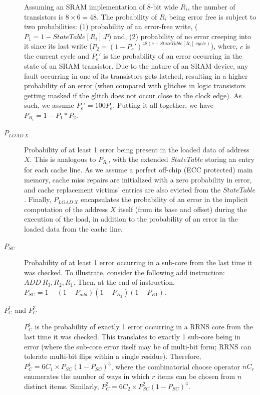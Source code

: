 \documentclass{sig-alternate}
\begin{document}
\begin{description}
Assuming an SRAM implementation of 8-bit wide $R_i$, the number of transistors is $8\times 6=48$. The probability of $R_i$ being error free is subject to two probabilities: (1) probability of an error-free write, ($P_1 = 1 - StateTable[R_i].P$) and, (2) probability of no error creeping into it since its last write ($P_2 = (1 - P_e')^{48(c - StateTable[R_i].cycle)}$), where, $c$ is the current cycle and $P_e'$ is the probability of an error occurring in the state of an SRAM transistor. Due to the nature of an SRAM device, any fault occurring in one of its transistors gets latched, resulting in a higher probability of an error (when compared with glitches in logic transistors getting masked if the glitch does not occur close to the clock edge). As such, we assume $P_e'=100P_e$. Putting it all together, we have $P_{R_i} = 1 - P_1*P_2$.

\item[$P_{LOAD ~X}$]
Probability of at least 1 error being present in the loaded data of address $X$. This is analogous to $P_{R_i}$, with the extended $StateTable$ storing an entry for each cache line. As we assume a perfect off-chip (ECC protected) main memory, cache miss repairs are initialized with a zero probability in error, and cache replacement victims' entries are also evicted from the $StateTable$. Finally, $P_{LOAD~X}$ encapsulates the probability of an error in the implicit computation of the address $X$ itself (from its base and offset) during the execution of the load, in addition to the probability of an error in the loaded data from the cache line.

\item[$P_{SC}$]
Probability of at least 1 error occurring in a sub-core from the last time it was checked. To illustrate, consider the following add instruction: $ADD~R_3,R_2,R_1$. Then, at the end of instruction, $P_{SC}=1-(1-P_{add})(1-P_{R_2})(1-P_{R1})$.

\item[$P_C^{1}$ and $P_C^{2}$]
$P_C^{1}$ is the probability of exactly 1 error occurring in a RRNS core from the last time it was checked. This translates to exactly 1 sub-core being in error (where the sub-core error itself may be of multi-bit form; RRNS can tolerate multi-bit flips within a single residue). Therefore, $P_C^{1}=6C_1\times P_{SC}(1-P_{SC})^5$, where the combinatorial choose operator $nC_r$ enumerates the number of ways in which $r$ items can be chosen from $n$ distinct items. Similarly, $P_C^{2}=6C_2\times P_{SC}^2(1-P_{SC})^4$.


\end{description}
\end{document}
